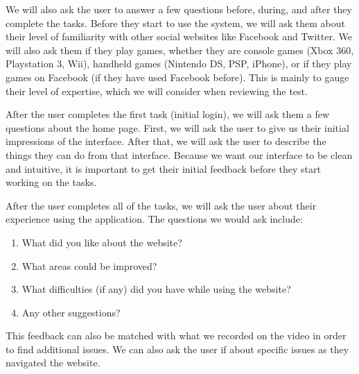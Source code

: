 We will also ask the user to answer a few questions before, during, and after they complete the tasks.  Before they start to use the system, we will ask them about their level of familiarity with other social websites like Facebook and Twitter.  We will also ask them if they play games, whether they are console games (Xbox 360, Playstation 3, Wii), handheld games (Nintendo DS, PSP, iPhone), or if they play games on Facebook (if they have used Facebook before).  This is mainly to gauge their level of expertise, which we will consider when reviewing the test.

After the user completes the first task (initial login), we will ask them a few questions about the home page.  First, we will ask the user to give us their initial impressions of the interface.  After that, we will ask the user to describe the things they can do from that interface.  Because we want our interface to be clean and intuitive, it is important to get their initial feedback before they start working on the tasks.

After the user completes all of the tasks, we will ask the user about their experience using the application.  The questions we would ask include:

\begin{enumerate}
  \item What did you like about the website?
  \item What areas could be improved?
  \item What difficulties (if any) did you have while using the website?
  \item Any other suggestions?
\end{enumerate}

This feedback can also be matched with what we recorded on the video in order to find additional issues.  We can also ask the user if about specific issues as they navigated the website.

% 

